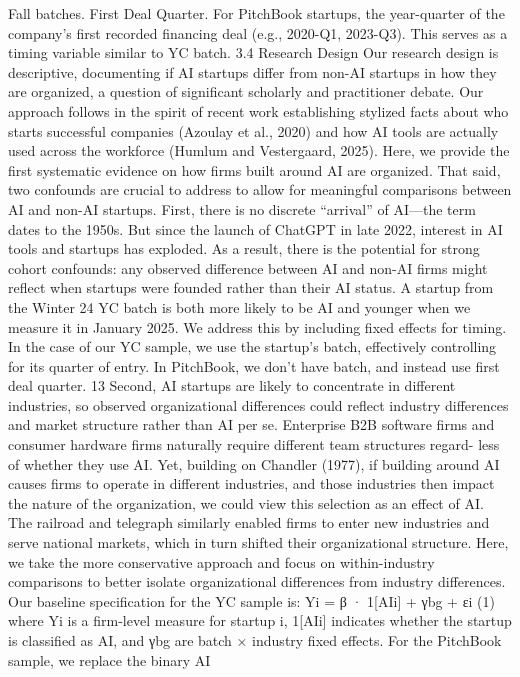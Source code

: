 Fall batches.
First Deal Quarter.
For PitchBook startups, the year-quarter of the company’s first recorded
financing deal (e.g., 2020-Q1, 2023-Q3). This serves as a timing variable similar to YC batch.
3.4
Research Design
Our research design is descriptive, documenting if AI startups differ from non-AI startups in how
they are organized, a question of significant scholarly and practitioner debate. Our approach follows
in the spirit of recent work establishing stylized facts about who starts successful companies (Azoulay
et al., 2020) and how AI tools are actually used across the workforce (Humlum and Vestergaard,
2025). Here, we provide the first systematic evidence on how firms built around AI are organized.
That said, two confounds are crucial to address to allow for meaningful comparisons between
AI and non-AI startups. First, there is no discrete “arrival” of AI—the term dates to the 1950s.
But since the launch of ChatGPT in late 2022, interest in AI tools and startups has exploded. As
a result, there is the potential for strong cohort confounds: any observed difference between AI and
non-AI firms might reflect when startups were founded rather than their AI status. A startup from
the Winter 24 YC batch is both more likely to be AI and younger when we measure it in January
2025. We address this by including fixed effects for timing. In the case of our YC sample, we use the
startup’s batch, effectively controlling for its quarter of entry. In PitchBook, we don’t have batch,
and instead use first deal quarter.
13
Second, AI startups are likely to concentrate in different industries, so observed organizational
differences could reflect industry differences and market structure rather than AI per se. Enterprise
B2B software firms and consumer hardware firms naturally require different team structures regard-
less of whether they use AI. Yet, building on Chandler (1977), if building around AI causes firms to
operate in different industries, and those industries then impact the nature of the organization, we
could view this selection as an effect of AI. The railroad and telegraph similarly enabled firms to
enter new industries and serve national markets, which in turn shifted their organizational structure.
Here, we take the more conservative approach and focus on within-industry comparisons to better
isolate organizational differences from industry differences.
Our baseline specification for the YC sample is:
Yi = β · 1[AIi] + γbg + εi
(1)
where Yi is a firm-level measure for startup i, 1[AIi] indicates whether the startup is classified as
AI, and γbg are batch × industry fixed effects. For the PitchBook sample, we replace the binary AI
